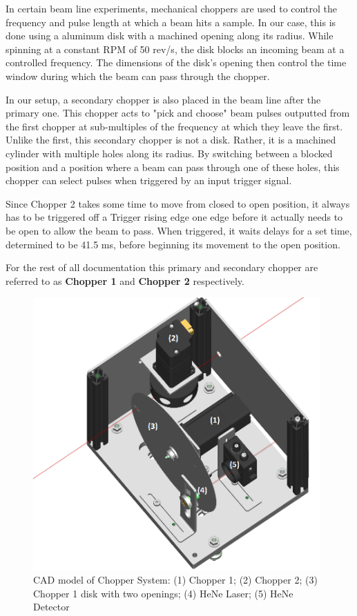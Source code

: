 \documentclass{article}
\begin{document}
        In certain beam line experiments, mechanical choppers are used to control the frequency and pulse length at which a beam hits a sample. In our case, this is done using a aluminum disk with a machined opening along its radius. While spinning at a constant RPM of 50 rev/s, the disk blocks an incoming beam at a controlled frequency. The dimensions of the disk's opening then control the time window during which the beam can pass through the chopper.
        
        In our setup, a secondary chopper is also placed in the beam line after the primary one. This chopper acts to "pick and choose" beam pulses outputted from the first chopper at sub-multiples of the frequency at which they leave the first. Unlike the first, this secondary chopper is not a disk. Rather, it is a machined cylinder with multiple holes along its radius. By switching between a blocked position and a position where a beam can pass through one of these holes, this chopper can select pulses when triggered by an input trigger signal.
        
        Since Chopper 2 takes some time to move from closed to open position, it always has to be triggered off a Trigger rising edge one edge before it actually needs to be open to allow the beam to pass. When triggered, it waits delays for a set time, determined to be 41.5 ms, before beginning its movement to the open position.
        
        For the rest of all documentation this primary and secondary chopper are referred to as \textbf{Chopper 1} and \textbf{Chopper 2} respectively.
        
        \begin{figure}[h]
            \centering
            \includegraphics[width=11cm]{img/chopper_full_cad}
            \caption{CAD model of Chopper System: (1) Chopper 1; (2) Chopper 2; (3) Chopper 1 disk with two openings; (4) HeNe Laser; (5) HeNe Detector}
            \label{fig:chopper_full_cad}
        \end{figure}
    
\end{document}
